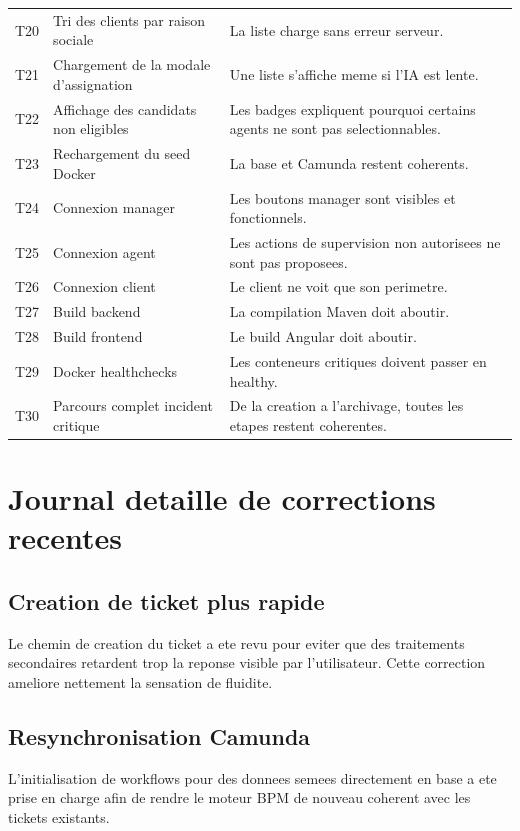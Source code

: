 \begin{longtable}{>{\raggedright\arraybackslash}p{1.2cm} >{\raggedright\arraybackslash}p{4.2cm} >{\raggedright\arraybackslash}p{7.6cm}}
T20 & Tri des clients par raison sociale & La liste charge sans erreur serveur. \\
T21 & Chargement de la modale d'assignation & Une liste s'affiche meme si l'IA est lente. \\
T22 & Affichage des candidats non eligibles & Les badges expliquent pourquoi certains agents ne sont pas selectionnables. \\
T23 & Rechargement du seed Docker & La base et Camunda restent coherents. \\
T24 & Connexion manager & Les boutons manager sont visibles et fonctionnels. \\
T25 & Connexion agent & Les actions de supervision non autorisees ne sont pas proposees. \\
T26 & Connexion client & Le client ne voit que son perimetre. \\
T27 & Build backend & La compilation Maven doit aboutir. \\
T28 & Build frontend & Le build Angular doit aboutir. \\
T29 & Docker healthchecks & Les conteneurs critiques doivent passer en healthy. \\
T30 & Parcours complet incident critique & De la creation a l'archivage, toutes les etapes restent coherentes. \\
\bottomrule
\end{longtable}

\chapter{Journal detaille de corrections recentes}

\section{Creation de ticket plus rapide}

Le chemin de creation du ticket a ete revu pour eviter que des traitements secondaires retardent trop la reponse visible par l'utilisateur. Cette correction ameliore nettement la sensation de fluidite.

\section{Resynchronisation Camunda}

L'initialisation de workflows pour des donnees semees directement en base a ete prise en charge afin de rendre le moteur BPM de nouveau coherent avec les tickets existants.

